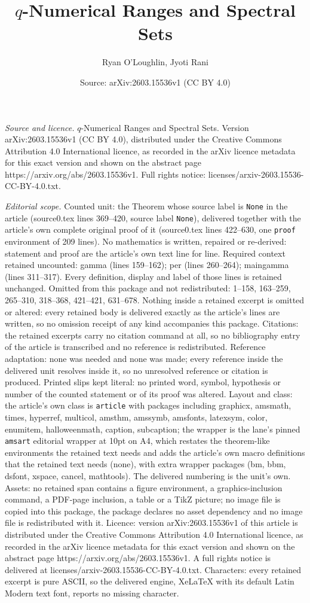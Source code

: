 \documentclass[10pt,a4paper]{amsart}
\title[$q$-Numerical Ranges and Spectral Sets]{$q$-Numerical Ranges and Spectral Sets}
\author{Ryan O'Loughlin, Jyoti Rani}
\date{Source: arXiv:2603.15536v1 (CC BY 4.0)}
\begin{document}
\maketitle

\noindent\emph{Source and licence.} $q$-Numerical Ranges and Spectral Sets. Version arXiv:2603.15536v1 (CC BY 4.0), distributed under the Creative Commons Attribution 4.0 International licence, as recorded in the arXiv licence metadata for this exact version and shown on the abstract page https://arxiv.org/abs/2603.15536v1. Full rights notice: licenses/arxiv-2603.15536-CC-BY-4.0.txt.\par\smallskip

\noindent\textit{Editorial scope.} Counted unit: the Theorem whose source label is \texttt{None} in the article (source0.tex lines 369--420, source label \texttt{None}), delivered together with the article's own complete original proof of it (source0.tex lines 422--630, one \texttt{proof} environment of 209 lines). No mathematics is written, repaired or re-derived: statement and proof are the article's own text line for line. Required context retained uncounted: gamma (lines 159--162); per (lines 260--264); maingamma (lines 311--317). Every definition, display and label of those lines is retained unchanged. Omitted from this package and not redistributed: 1--158, 163--259, 265--310, 318--368, 421--421, 631--678. Nothing inside a retained excerpt is omitted or altered: every retained body is delivered exactly as the article's lines are written, so no omission receipt of any kind accompanies this package. Citations: the retained excerpts carry no citation command at all, so no bibliography entry of the article is transcribed and no reference is redistributed. Reference adaptation: none was needed and none was made; every reference inside the delivered unit resolves inside it, so no unresolved reference or citation is produced. Printed slips kept literal: no printed word, symbol, hypothesis or number of the counted statement or of its proof was altered. Layout and class: the article's own class is \texttt{article} with packages including graphicx, amsmath, times, hyperref, multicol, amsthm, amssymb, amsfonts, latexsym, color, enumitem, halloweenmath, caption, subcaption; the wrapper is the lane's pinned \texttt{amsart} editorial wrapper at 10pt on A4, which restates the theorem-like environments the retained text needs and adds the article's own macro definitions that the retained text needs (none), with extra wrapper packages (bm, bbm, dsfont, xspace, cancel, mathtools). The delivered numbering is the unit's own. Assets: no retained span contains a figure environment, a graphics-inclusion command, a PDF-page inclusion, a table or a TikZ picture; no image file is copied into this package, the package declares no asset dependency and no image file is redistributed with it. Licence: version arXiv:2603.15536v1 of this article is distributed under the Creative Commons Attribution 4.0 International licence, as recorded in the arXiv licence metadata for this exact version and shown on the abstract page https://arxiv.org/abs/2603.15536v1. A full rights notice is delivered at licenses/arxiv-2603.15536-CC-BY-4.0.txt. Characters: every retained excerpt is pure ASCII, so the delivered engine, XeLaTeX with its default Latin Modern text font, reports no missing character.
\end{document}
